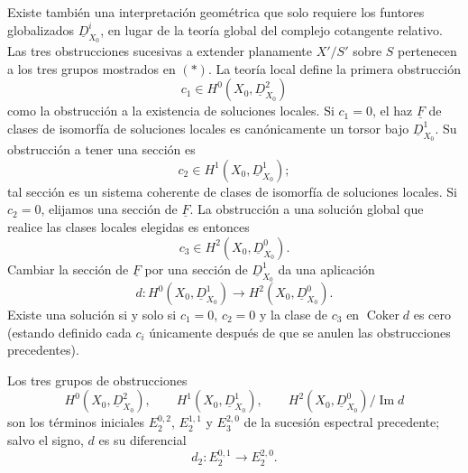 Existe también una interpretación geométrica que solo requiere los
funtores globalizados $\underline D^i_{X_0}$, en lugar de la teoría
global del complejo cotangente relativo. Las tres obstrucciones
sucesivas a extender planamente $X'/S'$ sobre $S$ pertenecen a los
tres grupos mostrados en $(*)$. La teoría local define la primera
obstrucción
\[
c_1\in H^0(X_0,\underline D^2_{X_0})
\]
como la obstrucción a la existencia de soluciones locales. Si
$c_1=0$, el haz $\underline F$ de clases de isomorfía de soluciones
locales es canónicamente un torsor bajo $\underline D^1_{X_0}$. Su
obstrucción a tener una sección es
\[
c_2\in H^1(X_0,\underline D^1_{X_0});
\]
tal sección es un sistema coherente de clases de isomorfía de
soluciones locales. Si $c_2=0$, elijamos una sección de
$\underline F$. La obstrucción a una solución global que realice las
clases locales elegidas es entonces
\[
c_3\in H^2(X_0,\underline D^0_{X_0}).
\]
Cambiar la sección de $\underline F$ por una sección de
$\underline D^1_{X_0}$ da una aplicación
\[
d:H^0(X_0,\underline D^1_{X_0})
\longrightarrow H^2(X_0,\underline D^0_{X_0}).
\]
Existe una solución si y solo si $c_1=0$, $c_2=0$ y la clase de
$c_3$ en $\operatorname{Coker}d$ es cero (estando definido cada
$c_i$ únicamente después de que se anulen las obstrucciones
precedentes).


Los tres grupos de obstrucciones
\[
H^0(X_0,\underline D^2_{X_0}),
\qquad
H^1(X_0,\underline D^1_{X_0}),
\qquad
H^2(X_0,\underline D^0_{X_0})/\operatorname{Im}d
\]
son los términos iniciales $E_2^{0,2}$, $E_2^{1,1}$ y $E_3^{2,0}$
de la sucesión espectral precedente; salvo el signo, $d$ es su
diferencial
\[
d_2:E_2^{0,1}\longrightarrow E_2^{2,0}.
\]
